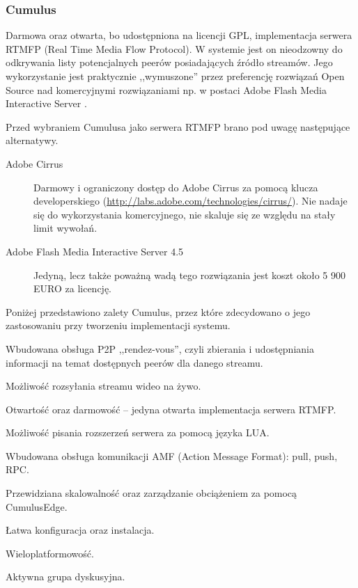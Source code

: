 \newpage
\subsubsection{Cumulus}
Darmowa oraz otwarta, bo udostępniona na licencji GPL, implementacja serwera RTMFP (Real Time Media Flow Protocol). W systemie jest on nieodzowny do odkrywania listy potencjalnych peerów posiadających źródło streamów. Jego wykorzystanie jest praktycznie ,,wymuszone'' przez preferencję rozwiązań Open Source nad komercyjnymi rozwiązaniami np. w postaci Adobe Flash Media Interactive Server \cite{Cumulus}.

Przed wybraniem Cumulusa jako serwera RTMFP brano pod uwagę następujące alternatywy.
\begin{description}
    \item[Adobe Cirrus] Darmowy i ograniczony dostęp do Adobe Cirrus za pomocą klucza developerskiego (\url{http://labs.adobe.com/technologies/cirrus/}). Nie nadaje się do wykorzystania komercyjnego, nie skaluje się ze względu na stały limit wywołań.
    \item[Adobe Flash Media Interactive Server 4.5] Jedyną, lecz także poważną wadą tego rozwiązania jest koszt około 5 900 EURO za licencję.
\end{description}

Poniżej przedstawiono zalety Cumulus, przez które zdecydowano o jego zastosowaniu przy tworzeniu implementacji systemu.
\begin{packed_item}
    \item{Wbudowana obsługa P2P ,,rendez-vous'', czyli zbierania i udostępniania informacji na temat dostępnych peerów dla danego streamu.}
    \item{Możliwość rozsyłania streamu wideo na żywo.}
    \item{Otwartość oraz darmowość -- jedyna otwarta implementacja serwera RTMFP.}
    \item{Możliwość pisania rozszerzeń serwera za pomocą języka LUA.}
    \item{Wbudowana obsługa komunikacji AMF (Action Message Format): pull, push, RPC.}
    \item{Przewidziana skalowalność oraz zarządzanie obciążeniem za pomocą CumulusEdge.}
    \item{Łatwa konfiguracja oraz instalacja.}
    \item{Wieloplatformowość.}
    \item{Aktywna grupa dyskusyjna.}
\end{packed_item}

